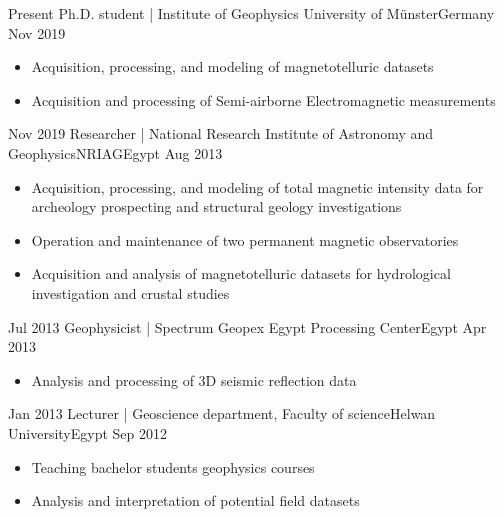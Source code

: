 
\begin{experiences}
	\experience
	{Present}   {Ph.D. student | Institute of Geophysics} {University of Münster}{Germany}
	{Nov 2019} {
		\begin{itemize}
			\item Acquisition, processing, and modeling of magnetotelluric datasets
			\item Acquisition and processing of Semi-airborne Electromagnetic measurements
		\end{itemize}
	}
	{}
	\emptySeparator

	\experience
	{Nov 2019} {Researcher | National Research Institute of Astronomy and Geophysics}{NRIAG}{Egypt}
	{Aug 2013}    {
		\begin{itemize}
			\item Acquisition, processing, and modeling of total magnetic intensity data for archeology prospecting and structural geology investigations
			\item Operation and maintenance of two permanent magnetic observatories
			\item Acquisition and analysis of magnetotelluric datasets for hydrological investigation and crustal studies
		\end{itemize}
	}
	{}
	\emptySeparator



	\experience
	{Jul 2013} {Geophysicist | Spectrum Geopex Egypt Processing Center}{}{Egypt}
	{Apr 2013}    {
		\begin{itemize}
			\item Analysis and processing of 3D seismic reflection data
		\end{itemize}
	}
	{}
	\emptySeparator


	\experience
	{Jan 2013}     {Lecturer | Geoscience department, Faculty of science}{Helwan University}{Egypt}
	{Sep 2012}    {
		\begin{itemize}
			\item Teaching bachelor students geophysics courses
			\item Analysis and interpretation of potential field datasets
		\end{itemize}
	}
	{}
\end{experiences}
